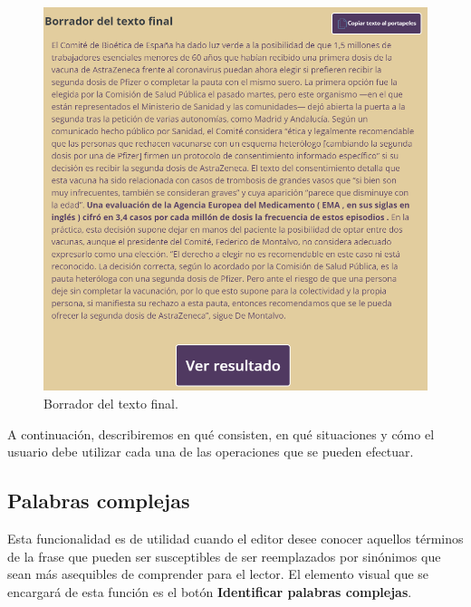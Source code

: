 \begin{figure}[h!]
	\centering
	\includegraphics[scale=1.0]{Imagenes/Figuras/borradorTextoFinal}
	\caption{Borrador del texto final.}
	\label{fig:borradorTextoFinal}
\end{figure}


A continuación, describiremos en qué consisten, en qué situaciones y cómo el usuario debe utilizar cada una de las operaciones que se pueden efectuar.

\subsection{Palabras complejas}
Esta funcionalidad es de utilidad cuando el editor desee conocer aquellos términos de la frase que pueden ser susceptibles de ser reemplazados por sinónimos que sean más asequibles de comprender para el lector. El elemento visual que se encargará de esta función es el botón \textbf{Identificar palabras complejas}.


